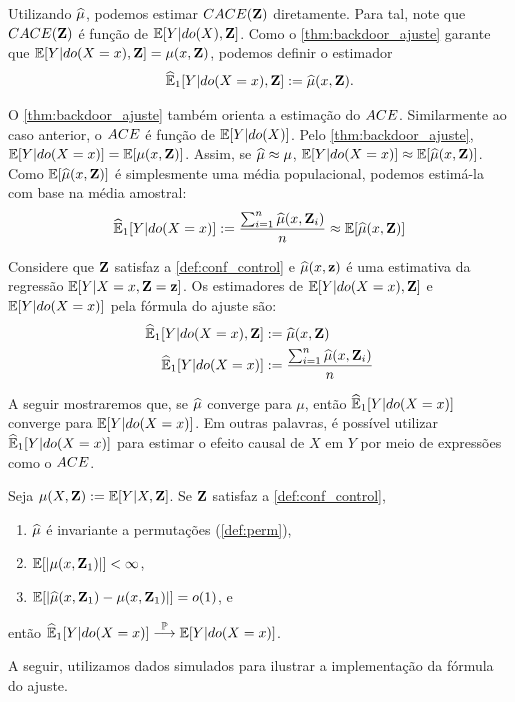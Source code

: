 Utilizando ${\widehat{\mu}}$, podemos estimar
${CACE}({\mathbf{Z}})$ diretamente.
Para tal, note que ${CACE}({\mathbf{Z}})$ é
função de ${\mathbb E}[Y|do(X),{\mathbf{Z}}]$.
Como o \cref{thm:backdoor_ajuste} garante que
${\mathbb E}[Y|do(X=x),{\mathbf{Z}}] = \mu(x,{\mathbf{Z}})$,
podemos definir o estimador
\begin{align*}
 {\widehat{{\mathbb E}}}_{1}[Y|do(X=x),{\mathbf{Z}}] := {\widehat{\mu}}(x,{\mathbf{Z}}).
\end{align*}

O \cref{thm:backdoor_ajuste} também 
orienta a estimação do ${ACE}$. 
Similarmente ao caso anterior,
o ${ACE}$ é função de ${\mathbb E}[Y|do(X)]$.
Pelo \cref{thm:backdoor_ajuste},
${\mathbb E}[Y|do(X=x)] = {\mathbb E}[\mu(x,{\mathbf{Z}})]$.
Assim, se ${\widehat{\mu}} \approx \mu$,
${\mathbb E}[Y|do(X=x)] \approx {\mathbb E}[{\widehat{\mu}}(x,{\mathbf{Z}})]$.
Como ${\mathbb E}[{\widehat{\mu}}(x,{\mathbf{Z}})]$ é simplesmente 
uma média populacional,
podemos estimá-la com base
na média amostral:
\begin{align*}
 {\widehat{{\mathbb E}}}_{1}[Y|do(X=x)] := \frac{\sum_{i=1}^n {\widehat{\mu}}(x,{\mathbf{Z}}_i)}{n} \approx {\mathbb E}[{\widehat{\mu}}(x,{\mathbf{Z}})]
\end{align*}

\begin{definition}
 \label{def:ajuste}
 Considere que ${\mathbf{Z}}$ satisfaz a \cref{def:conf_control} e
 ${\widehat{\mu}}(x,{\mathbf{z}})$ é uma estimativa 
 da regressão ${\mathbb E}[Y|X=x,{\mathbf{Z}}={\mathbf{z}}]$.
 Os estimadores de 
 ${\mathbb E}[Y|do(X=x),{\mathbf{Z}}]$ e
 ${\mathbb E}[Y|do(X=x)]$ pela
 fórmula do ajuste são:
\begin{align*}
 {\widehat{{\mathbb E}}}_{1}[Y|do(X=x),{\mathbf{Z}}] &:= {\widehat{\mu}}(x,{\mathbf{Z}}) \\
 {\widehat{{\mathbb E}}}_{1}[Y|do(X=x)] &:= \frac{\sum_{i=1}^n {\widehat{\mu}}(x,{\mathbf{Z}}_i)}{n}
\end{align*}
\end{definition}

A seguir mostraremos que,
se ${\widehat{\mu}}$ converge para $\mu$, então
${\widehat{{\mathbb E}}}_{1}[Y|do(X=x)]$ converge para ${\mathbb E}[Y|do(X=x)]$.
Em outras palavras, é possível utilizar
${\widehat{{\mathbb E}}}_{1}[Y|do(X=x)]$ para estimar o efeito causal de $X$ em $Y$
por meio de expressões como o ${ACE}$.

\begin{theorem}
 \label{thm:conv_ajuste}
 Seja $\mu(X,{\mathbf{Z}}) := {\mathbb E}[Y|X,{\mathbf{Z}}]$.
 Se ${\mathbf{Z}}$ satisfaz a \cref{def:conf_control},
 \begin{enumerate}
  \item ${\widehat{\mu}}$ é invariante a permutações (\cref{def:perm}),
  \item ${\mathbb E}[|\mu(x,{\mathbf{Z}}_1)|] < \infty$,
  \item ${\mathbb E}[|{\widehat{\mu}}(x,{\mathbf{Z}}_1)-\mu(x,{\mathbf{Z}}_1)|] = o(1)$, e
 \end{enumerate}
 então ${\widehat{{\mathbb E}}}_{1}[Y|do(X=x)] \stackrel{{\mathbb P}}{\longrightarrow} {\mathbb E}[Y|do(X=x)]$.
\end{theorem}

A seguir, utilizamos dados simulados para
ilustrar a implementação da fórmula do ajuste.

